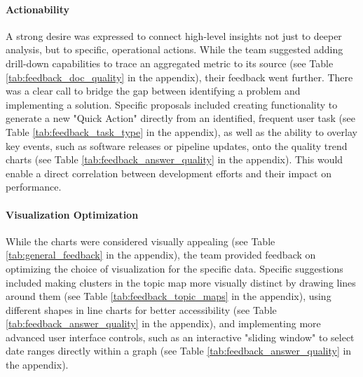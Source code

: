 \documentclass[
	english,
	ruledheaders=section,%
	class=report,%
	thesis={type=bachelor},%
	accentcolor=1b,%
	custommargins=true,%
	marginpar=false,%
	parskip=half-,%
	fontsize=11pt,%
	DIV=14,
]{tudapub}
\begin{document}
\paragraph{Actionability} A strong desire was expressed to connect high-level insights not just to deeper analysis, but to specific, operational actions. While the team suggested adding drill-down capabilities to trace an aggregated metric to its source (see Table \ref{tab:feedback_doc_quality} in the appendix), their feedback went further. There was a clear call to bridge the gap between identifying a problem and implementing a solution. Specific proposals included creating functionality to generate a new "Quick Action" directly from an identified, frequent user task (see Table  \ref{tab:feedback_task_type} in the appendix), as well as the ability to overlay key events, such as software releases or pipeline updates, onto the quality trend charts (see Table \ref{tab:feedback_answer_quality} in the appendix). This would enable a direct correlation between development efforts and their impact on performance.
\paragraph{Visualization Optimization} While the charts were considered visually appealing (see Table \ref{tab:general_feedback} in the appendix), the team provided feedback on optimizing the choice of visualization for the specific data. Specific suggestions included making clusters in the topic map more visually distinct by drawing lines around them (see Table \ref{tab:feedback_topic_maps} in the appendix), using different shapes in line charts for better accessibility (see Table \ref{tab:feedback_answer_quality} in the appendix), and implementing more advanced user interface controls, such as an interactive "sliding window" to select date ranges directly within a graph (see Table \ref{tab:feedback_answer_quality} in the appendix).
\end{document}
